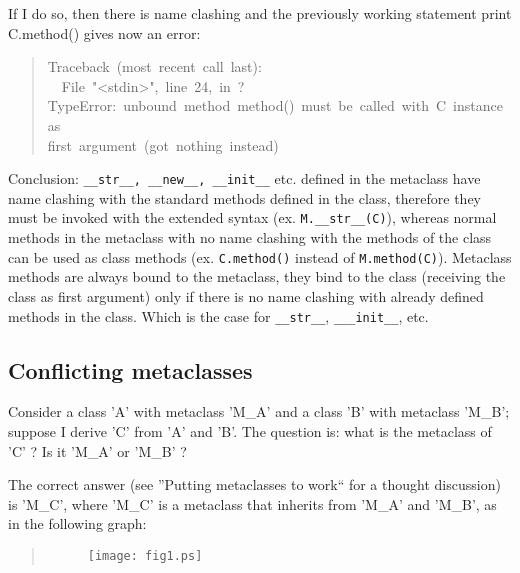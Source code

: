 \documentclass[10pt,english]{article}
\begin{document}
If I do so, then there is name clashing and the previously working
statement print C.method() gives now an error:
\begin{quote}
\begin{ttfamily}\begin{flushleft}
\mbox{Traceback~(most~recent~call~last):}\\
\mbox{~~File~"<stdin>",~line~24,~in~?}\\
\mbox{TypeError:~unbound~method~method()~must~be~called~with~C~instance~as}\\
\mbox{first~argument~(got~nothing~instead)}
\end{flushleft}\end{ttfamily}
\end{quote}

Conclusion: \texttt{{\_}{\_}str{\_}{\_}, {\_}{\_}new{\_}{\_}, {\_}{\_}init{\_}{\_}} etc. defined in the metaclass
have name clashing with the standard methods defined in the class, therefore
they must be invoked with the extended syntax (ex. \texttt{M.{\_}{\_}str{\_}{\_}(C)}),
whereas normal methods in the metaclass with no name clashing with the methods
of the class can be used as class methods (ex. \texttt{C.method()} instead of
\texttt{M.method(C)}).
Metaclass methods are always bound to the metaclass, they bind to the class 
(receiving the class as first argument) only if there is no name clashing with 
already defined methods in the class. Which is the case for \texttt{{\_}{\_}str{\_}{\_}},
\texttt{{\_}{\_}{\_}init{\_}{\_}}, etc.



\hypertarget{conflicting-metaclasses}{}
\subsection*{Conflicting metaclasses}

Consider a class 'A' with metaclass 'M{\_}A' and a class 'B' with 
metaclass 'M{\_}B'; suppose I derive 'C' from 'A' and 'B'. The question is: 
what is the metaclass of 'C' ? Is it 'M{\_}A' or 'M{\_}B' ?

The correct answer (see ''Putting metaclasses to work`` for a thought 
discussion) is 'M{\_}C', where 'M{\_}C' is a metaclass that inherits from 
'M{\_}A' and 'M{\_}B', as in the following graph:
\begin{quote}
\begin{figure}

\texttt{[image: fig1.ps]}
\end{figure}
\end{quote}
\end{document}

